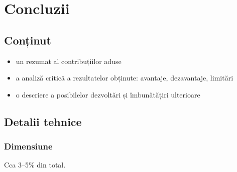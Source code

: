 \chapter{Concluzii}


\section{Conținut}

\begin{itemize}
 \item un rezumat al contribuțiilor aduse
 \item a analiză critică a rezultatelor obținute: avantaje, dezavantaje, limitări
 \item o descriere a posibilelor dezvoltări și îmbunătățiri ulterioare
\end{itemize}


\section{Detalii tehnice}

\subsection{Dimensiune}

Cca 3--5\% din total.








